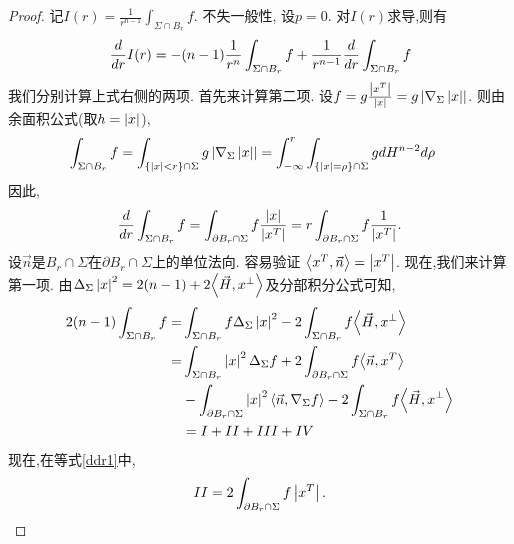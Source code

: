 \begin{proof}
     记$I(r)=\frac{1}{r^{n-1}}\int_{\Sigma\cap B_r} f$. 不失一般性, 设$p=0$. 对$I(r)$求导,则有
     \begin{equation} \label{ddr}
        \frac{d}{dr} I(r)=-(n-1)\frac{1}{r^n}\int_{\Sigma \cap B_r} f + \frac{1}{r^{n-1}}\frac{d}{dr} \int_{\Sigma \cap B_r} f
     \end{equation}
     我们分别计算上式右侧的两项. 首先来计算第二项. 设$f=g\frac{\left | x^T \right |}{\left | x \right |}=g\left | \nabla_\Sigma \left | x \right | \right |$. 则由余面积公式(取$h=\left | x \right |$),
     \begin{equation}
        \begin{split}
            \int_{\Sigma \cap B_r} f = \int_{\{\left | x \right | < r\}\cap \Sigma }g \left | \nabla_\Sigma \left | x \right | \right | &= \int^r_{-\infty} \int_{\{\left | x \right |=\rho\} \cap \Sigma} g dH^{n-2}d\rho 
        \end{split}
     \end{equation}
     因此, 
     \begin{equation} \label{ddr2}
        \frac{d}{dr} \int_{\Sigma \cap B_r} f= \int_{\partial B_r \cap \Sigma} f \frac{\left | x \right |}{\left | x^T \right |} =r\int_{\partial B_r\cap \Sigma} f \frac{1}{\left | x^T \right |}.
     \end{equation}
     设$\vec{n}$是$B_r\cap \Sigma$在$\partial B_r\cap \Sigma$上的单位法向. 容易验证 ${\left < x^T, \vec{n} \right >}= \left | x^T \right |$.  现在,我们来计算第一项. 由$\Delta_\Sigma \left | x \right |^2=2(n-1)+2{\left < \vec{H}, x^\perp \right >}$及分部积分公式可知,
     \begin{equation} \label{ddr1}
        \begin{split}
            2(n-1)\int_{\Sigma \cap B_r}f =&\int_{\Sigma \cap B_r}f \Delta_{\Sigma}\left | x \right |^2-2\int_{\Sigma \cap B_r} f{\left < \vec{H}, x^\perp \right >} \\
            =& \int_{\Sigma \cap B_r}\left | x \right |^2 \Delta_\Sigma f + 2\int_{\partial B_r\cap \Sigma}f{\left < \vec{n}, x^T \right >}  \\
            &- \int_{\partial B_r \cap \Sigma}\left | x \right |^2 {\left < \vec{n}, \nabla_{\Sigma}f \right >}-2\int_{\Sigma \cap B_r} f{\left < \vec{H}, x^\perp \right >}\\
            &=I+II+III+IV
        \end{split}
     \end{equation}
     现在,在等式\eqref{ddr1}中,
     \begin{equation}
        II=2\int_{\partial B_r\cap \Sigma}f\left | x^T \right |.
     \end{equation}
     \begin{equation}

\end{equation}
\end{proof}
